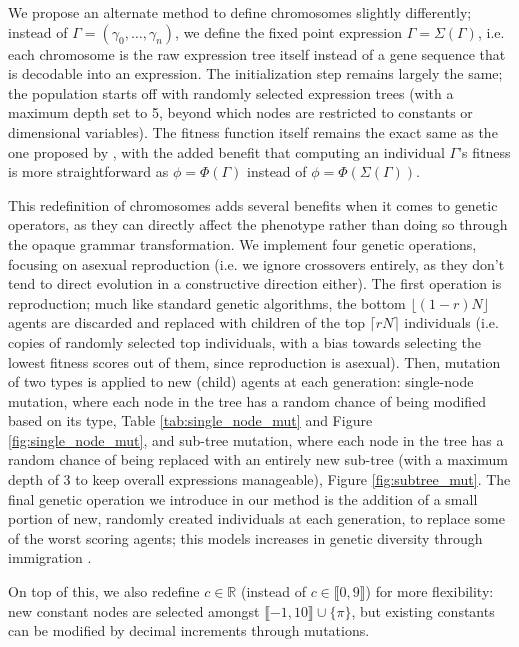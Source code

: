 \documentclass[aps,reprint,superscriptaddress,nofootinbib]{revtex4-2}
\begin{document}
We propose an alternate method to define chromosomes slightly differently; instead of \(\Gamma = \left(\gamma_0, \ldots, \gamma_n\right)\), we define the fixed point expression \(\Gamma = \Sigma(\Gamma)\), i.e. each chromosome is the raw expression tree itself instead of a gene sequence that is decodable into an expression. The initialization step remains largely the same; the population starts off with randomly selected expression trees (with a maximum depth set to 5, beyond which nodes are restricted to constants or dimensional variables). The fitness function itself remains the exact same as the one proposed by \cite{solving_diff_reproduce}, with the added benefit that computing an individual \(\Gamma\)'s fitness is more straightforward as \(\phi = \Phi(\Gamma)\) instead of \(\phi = \Phi(\Sigma(\Gamma))\).

This redefinition of chromosomes adds several benefits when it comes to genetic operators, as they can directly affect the phenotype rather than doing so through the opaque grammar transformation. We implement four genetic operations, focusing on asexual reproduction (i.e. we ignore crossovers entirely, as they don't tend to direct evolution in a constructive direction either). The first operation is reproduction; much like standard genetic algorithms, the bottom \(\lfloor (1-r)N\rfloor\) agents are discarded and replaced with children of the top \(\lceil rN\rceil\) individuals (i.e. copies of randomly selected top individuals, with a bias towards selecting the lowest fitness scores out of them, since reproduction is asexual). Then, mutation of two types is applied to new (child) agents at each generation: single-node mutation, where each node in the tree has a random chance of being modified based on its type, Table \ref{tab:single_node_mut} and Figure \ref{fig:single_node_mut}, and sub-tree mutation, where each node in the tree has a random chance of being replaced with an entirely new sub-tree (with a maximum depth of 3 to keep overall expressions manageable), Figure \ref{fig:subtree_mut}. The final genetic operation we introduce in our method is the addition of a small portion of new, randomly created individuals at each generation, to replace some of the worst scoring agents; this models increases in genetic diversity through immigration \cite{lions}.

On top of this, we also redefine \(c \in \mathbb{R}\) (instead of \(c \in \llbracket0,9\rrbracket\)) for more flexibility: new constant nodes are selected amongst \(\llbracket-1,10\rrbracket \cup \{\pi\}\), but existing constants can be modified by decimal increments through mutations.
\end{document}
